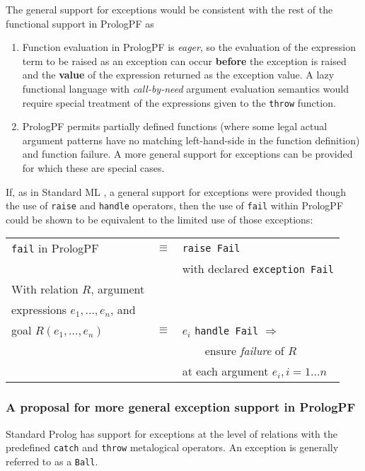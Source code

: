 The general support for exceptions would be consistent with the rest of the
functional support in PrologPF as
\begin{enumerate}
\item{Function evaluation in PrologPF is \textit{eager}, so 
  the evaluation of the expression term to be raised as an
  exception can occur \textbf{before} the exception is raised
  and the \textbf{value} of the expression returned as the
  exception value.  A lazy functional language with 
  \textit{call-by-need} argument evaluation semantics would require
  special treatment of the expressions given to the \texttt{throw}
  function.}
\item{PrologPF permits partially defined functions (where some
  legal actual argument patterns have no matching left-hand-side in
  the function definition) and function failure.
  A more general support for exceptions can be provided for
  which these are special cases.
  }
\end{enumerate}

If, as in Standard ML \cite{MTH90}, a general support for
exceptions were provided though the use of \texttt{raise} and
\texttt{handle} operators, then the use of \texttt{fail} within
PrologPF could be shown to be equivalent to the limited use of 
those exceptions:\\
\begin{tabular}{l l l}
\texttt{fail} in PrologPF      &$\equiv$ &\texttt{raise Fail}\\
                               &         &with declared \texttt{exception Fail}\\[4mm]
With relation $R$, argument    &         &\\
expressions $e_1,...,e_n$, and &         & \\
goal $R(e_1,\ldots,e_n)$       &$\equiv$ &$e_i$ \texttt{handle Fail} $\Rightarrow$\\
                               &         &~~~~ensure \textit{failure} of $R$\\
                               &         &at each argument $e_i, i=1\ldots n$\\
\end{tabular}

\subsubsection{A proposal for more general exception support in PrologPF}

Standard Prolog \cite{DEC96} has support for exceptions at the
level of relations with the predefined \texttt{catch} and \texttt{throw}
metalogical operators.  An exception is generally referred to as a 
\texttt{Ball}.


